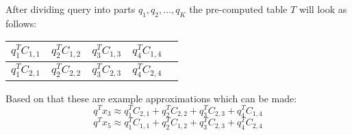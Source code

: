 \smallskip

After dividing query into parts $q_1, q_2, \ldots, q_K$ the pre-computed table $T$ will look as follows:
\smallskip
\renewcommand{\arraystretch}{1.6}
\begin{center}
\begin{tabular}{|c|c|c|c|c|}
\hline
$ q_1^T C_{1,1} $ & $ q_2^T C_{1,2} $ & $ q_3^T C_{1,3} $ & $ q_4^T C_{1,4} $ \\
\hline
$ q_1^T C_{2,1} $ & $ q_2^T C_{2,2} $ & $ q_3^T C_{2,3} $ & $ q_4^T C_{2,4} $\\
\hline
\end{tabular}
\end{center}

\smallskip

Based on that these are example approximations which can be made:
\[ q^T x_3 \approx q_1^T C_{2,1} + q_2^T C_{2,2} + q_3^T C_{2,3} + q_4^T C_{1,4} \]
\[ q^T x_5 \approx q_1^T C_{1,1} + q_2^T C_{1,2} + q_3^T C_{2,3} + q_4^T C_{2,4} \]
